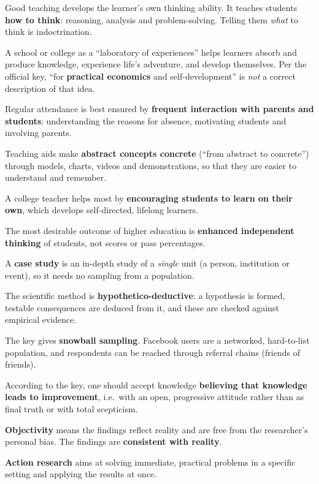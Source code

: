 Good teaching develops the learner's own thinking ability. It teaches students \textbf{how to think}: reasoning, analysis and problem-solving. Telling them \emph{what} to think is indoctrination.

A school or college as a ``laboratory of experiences'' helps learners absorb and produce knowledge, experience life's adventure, and develop themselves. Per the official key, ``for \textbf{practical economics} and self-development'' is \emph{not} a correct description of that idea.

Regular attendance is best ensured by \textbf{frequent interaction with parents and students}: understanding the reasons for absence, motivating students and involving parents.

Teaching aids make \textbf{abstract concepts concrete} (``from abstract to concrete'') through models, charts, videos and demonstrations, so that they are easier to understand and remember.

A college teacher helps most by \textbf{encouraging students to learn on their own}, which develops self-directed, lifelong learners.

The most desirable outcome of higher education is \textbf{enhanced independent thinking} of students, not scores or pass percentages.

A \textbf{case study} is an in-depth study of a \emph{single} unit (a person, institution or event), so it needs no sampling from a population.

The scientific method is \textbf{hypothetico-deductive}: a hypothesis is formed, testable consequences are deduced from it, and these are checked against empirical evidence.

The key gives \textbf{snowball sampling}. Facebook users are a networked, hard-to-list population, and respondents can be reached through referral chains (friends of friends).

According to the key, one should accept knowledge \textbf{believing that knowledge leads to improvement}, i.e.\ with an open, progressive attitude rather than as final truth or with total scepticism.

\textbf{Objectivity} means the findings reflect reality and are free from the researcher's personal bias. The findings are \textbf{consistent with reality}.

\textbf{Action research} aims at solving immediate, practical problems in a specific setting and applying the results at once.

